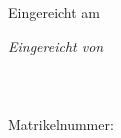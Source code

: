 \begin{titlepage}
\begin{center}
\end{center}

\vfill

\begin{center}
\large{Eingereicht am \submittedDate\\}
\end{center}
\vspace*{0.6cm}
\begin{flushleft}
\textit{Eingereicht von}\\
\vspace*{5pt}
\name\\
\street\\
\plzCity\\
\vspace*{5pt}
Matrikelnummer: \matnr \\

\end{flushleft}
\end{titlepage}

\newpage
